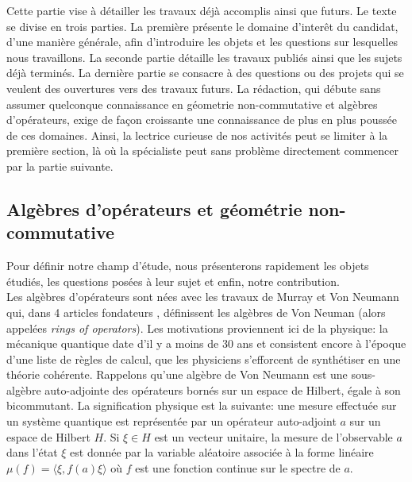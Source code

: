 \documentclass[a4paper,11pt]{article}
\begin{document}
Cette partie vise \`a d\'etailler les travaux d\'ej\`a accomplis ainsi que futurs. Le texte se divise en trois parties. La premi\`ere pr\'esente le domaine d'inter\^et du candidat, d'une mani\`ere g\'en\'erale, afin d'introduire les objets et les questions sur lesquelles nous travaillons. La seconde partie d\'etaille les travaux publi\'es ainsi que les sujets d\'ej\`a termin\'es. La derni\`ere partie se consacre \`a des questions ou des projets qui se veulent des ouvertures vers des travaux futurs. La r\'edaction, qui d\'ebute sans assumer quelconque connaissance en g\'eometrie non-commutative et alg\`ebres d'op\'erateurs, exige de fa\c{c}on croissante une connaissance de plus en plus pouss\'ee de ces domaines. Ainsi, la lectrice curieuse de nos activit\'es peut se limiter \`a la premi\`ere section, l\`a o\`u la sp\'ecialiste peut sans probl\`eme directement commencer par la partie suivante.

\subsection*{Alg\`ebres d'op\'erateurs et g\'eom\'etrie non-commutative}

Pour d\'efinir notre champ d'\'etude, nous pr\'esenterons rapidement les objets \'etudi\'es, les questions pos\'ees \`a leur sujet et enfin, notre contribution.\\

Les alg\`ebres d'op\'erateurs sont n\'ees avec les travaux de Murray et Von Neumann qui, dans 4 articles fondateurs \cite{murray1936rings}, d\'efinissent les alg\`ebres de Von Neuman (alors appel\'ees \textit{rings of operators}). Les motivations proviennent ici de la physique: la m\'ecanique quantique date d'il y a moins de 30 ans et consistent encore \`a l'\'epoque d'une liste de r\`egles de calcul, que les physiciens s'efforcent de synth\'etiser en une th\'eorie coh\'erente. Rappelons qu'une alg\`ebre de Von Neumann est une sous-alg\`ebre auto-adjointe des op\'erateurs born\'es sur un espace de  Hilbert, \'egale \`a son bicommutant. La signification physique est la suivante: une mesure effectu\'ee sur un syst\`eme quantique est repr\'esent\'ee par un op\'erateur auto-adjoint $a$ sur un espace de Hilbert $H$. Si $\xi \in H$ est un vecteur unitaire, la mesure de l'observable $a$ dans l'\'etat $\xi$ est donn\'ee par la variable al\'eatoire associ\'ee \`a la forme lin\'eaire $\mu(f) = \langle \xi , f(a) \xi \rangle$ o\`u $f$ est une fonction continue sur le spectre de $a$.  \\
\end{document}
